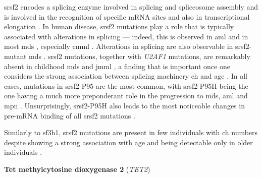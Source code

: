 \Ac{srsf2} encodes a splicing enzyme involved in splicing and spliceosome assembly \cite{Fu1992-wy} and is involved in the recognition of specific mRNA sites \cite{Liu2000-ax} and also in transcriptional elongation \cite{Lin2008-tj}. In human disease, \ac{srsf2} mutations play a role that is typically associated with alterations in splicing --- indeed, this is observed in \ac{aml} \cite{Yoshimi2019-ax} and in most \ac{mds} \cite{Yoshida2011-zp,Makishima2012-wr}, especially \ac{cmml} \cite{Patnaik2013-cv,Meggendorfer2012-jn}. Alterations in splicing are also observable in \ac{srsf2}-mutant \ac{mds} \cite{Rahman2020-bh}. \ac{srsf2} mutations, together with \textit{U2AF1} mutations, are remarkably absent in childhood \ac{mds} and \ac{jmml} \cite{Hirabayashi2012-jj,Kar2013-nw}, a finding that is important once one considers  the strong association between splicing machinery \ac{ch} and age \cite{Yoshida2011-zp}. In all cases, mutations in \ac{srsf2}-P95 are the most common, with \ac{srsf2}-P95H being the one having a much more preponderant role in the progression to \ac{mds}, \ac{aml} and \ac{mpn} \cite{Wang2021-wg,Smeets2018-yv,Nagata2019-hn}. Unsurprisingly, \ac{srsf2}-P95H also leads to the most noticeable changes in pre-mRNA binding of all \ac{srsf2} mutations \cite{Zhang2015-xu,Komeno2015-pq}.

Similarly to \ac{sf3b1}, \ac{srsf2} mutations are present in few individuals with \ac{ch} numbers \cite{Bolton2020-ct,Genovese2014-eu,Zink2017-zi,McKerrell2015-rl} despite showing a strong association with age and being detectable only in older individuals \cite{Bolton2020-ct,McKerrell2015-rl}.

\noindent \textbf{Tet methylcytosine dioxygenase 2} (\textit{TET2})


